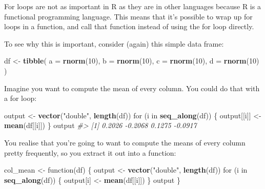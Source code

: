 \documentclass[]{book}
\newenvironment{Shaded}{\begin{snugshade}}{\end{snugshade}}
\newcommand{\KeywordTok}[1]{\textcolor[rgb]{0.13,0.29,0.53}{\textbf{{#1}}}}
\newcommand{\DataTypeTok}[1]{\textcolor[rgb]{0.13,0.29,0.53}{{#1}}}
\newcommand{\DecValTok}[1]{\textcolor[rgb]{0.00,0.00,0.81}{{#1}}}
\newcommand{\StringTok}[1]{\textcolor[rgb]{0.31,0.60,0.02}{{#1}}}
\newcommand{\CommentTok}[1]{\textcolor[rgb]{0.56,0.35,0.01}{\textit{{#1}}}}
\newcommand{\NormalTok}[1]{{#1}}
\begin{document}
For loops are not as important in R as they are in other languages
because R is a functional programming language. This means that it's
possible to wrap up for loops in a function, and call that function
instead of using the for loop directly.

To see why this is important, consider (again) this simple data frame:

\begin{Shaded}
\begin{Highlighting}[]
\NormalTok{df <-}\StringTok{ }\KeywordTok{tibble}\NormalTok{(}
  \DataTypeTok{a =} \KeywordTok{rnorm}\NormalTok{(}\DecValTok{10}\NormalTok{),}
  \DataTypeTok{b =} \KeywordTok{rnorm}\NormalTok{(}\DecValTok{10}\NormalTok{),}
  \DataTypeTok{c =} \KeywordTok{rnorm}\NormalTok{(}\DecValTok{10}\NormalTok{),}
  \DataTypeTok{d =} \KeywordTok{rnorm}\NormalTok{(}\DecValTok{10}\NormalTok{)}
\NormalTok{)}
\end{Highlighting}
\end{Shaded}

Imagine you want to compute the mean of every column. You could do that
with a for loop:

\begin{Shaded}
\begin{Highlighting}[]
\NormalTok{output <-}\StringTok{ }\KeywordTok{vector}\NormalTok{(}\StringTok{"double"}\NormalTok{, }\KeywordTok{length}\NormalTok{(df))}
\NormalTok{for (i in }\KeywordTok{seq_along}\NormalTok{(df)) \{}
  \NormalTok{output[[i]] <-}\StringTok{ }\KeywordTok{mean}\NormalTok{(df[[i]])}
\NormalTok{\}}
\NormalTok{output}
\CommentTok{#> [1]  0.2026 -0.2068  0.1275 -0.0917}
\end{Highlighting}
\end{Shaded}

You realise that you're going to want to compute the means of every
column pretty frequently, so you extract it out into a function:

\begin{Shaded}
\begin{Highlighting}[]
\NormalTok{col_mean <-}\StringTok{ }\NormalTok{function(df) \{}
  \NormalTok{output <-}\StringTok{ }\KeywordTok{vector}\NormalTok{(}\StringTok{"double"}\NormalTok{, }\KeywordTok{length}\NormalTok{(df))}
  \NormalTok{for (i in }\KeywordTok{seq_along}\NormalTok{(df)) \{}
    \NormalTok{output[i] <-}\StringTok{ }\KeywordTok{mean}\NormalTok{(df[[i]])}
  \NormalTok{\}}
  \NormalTok{output}
\NormalTok{\}}
\end{Highlighting}
\end{Shaded}
\end{document}
